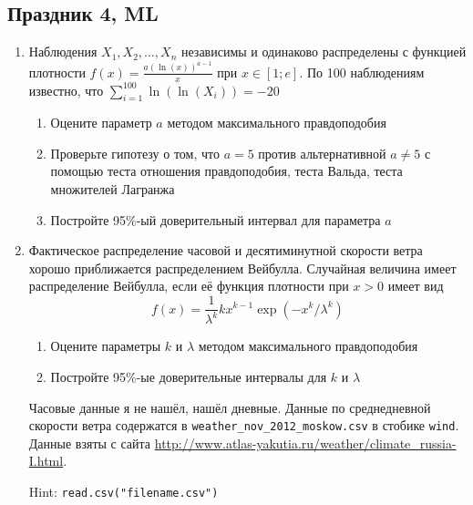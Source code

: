 \documentclass[12pt, a4paper]{article}
\begin{document}
\subsection{Праздник 4, ML}

\WhiteRoseLine

\begin{enumerate}
\item Наблюдения $X_1,X_2,\ldots,X_n$ независимы и одинаково распределены с функцией плотности $f(x)=\frac{a(\ln(x))^{a-1}}{x}$ при $x\in [1;e]$. По 100 наблюдениям известно, что $\sum_{i=1}^{100} \ln(\ln(X_i))=-20$
\begin{enumerate}
\item Оцените параметр $a$ методом максимального правдоподобия
\item Проверьте гипотезу о том, что $a=5$ против альтернативной $a\neq 5$ с помощью теста отношения правдоподобия, теста Вальда, теста множителей Лагранжа
\item Постройте 95\%-ый доверительный интервал для параметра $a$
\end{enumerate}
\item \useR Фактическое распределение часовой и десятиминутной скорости ветра хорошо приближается распределением Вейбулла. Случайная величина имеет распределение Вейбулла, если её функция плотности при $x>0$ имеет вид
\[
f(x)=\frac{1}{\lambda^k}kx^{k-1}\exp(-x^k/\lambda^k)
\]
\begin{enumerate}
\item Оцените параметры $k$ и $\lambda$ методом максимального правдоподобия
\item Постройте 95\%-ые доверительные интервалы для $k$ и $\lambda$
\end{enumerate}
Часовые данные я не нашёл, нашёл дневные. Данные по среднедневной скорости ветра содержатся в \verb|weather_nov_2012_moskow.csv| в стобике \verb|wind|. Данные взяты с сайта \url{http://www.atlas-yakutia.ru/weather/climate_russia-I.html}.

Hint: \verb|read.csv("filename.csv")|
\end{enumerate}

\RedRoseLine
\end{document}
